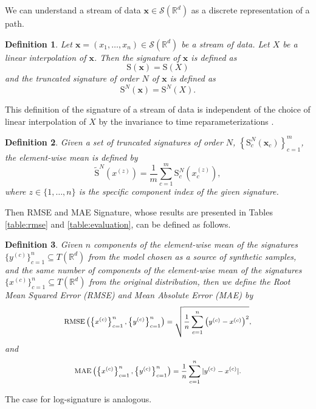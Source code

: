 \documentclass[lettersize,journal]{IEEEtran}
\newtheorem{definition}{Definition}
\begin{document}
We can understand a stream of data $\mathbf{x}\in \mathcal{S}(\mathbb{R}^{d})$ as a discrete representation of a path. 

\begin{definition}\label{def:s}
	Let $\mathbf x=(x_1, \ldots, x_n)\in \mathcal S(\mathbb R^d)$ be a stream of data. Let $X$ be a linear interpolation of $\mathbf x$. Then the signature of $\mathbf x$ is defined as
	\begin{equation}
	\mathrm{S}(\mathbf x) = \mathrm{S}(X)
	\end{equation}
	and the truncated signature of order $N$ of $\mathbf x$ is defined as
	\begin{equation}
	\mathrm{S}^N(\mathbf x) = \mathrm{S}^N(X).
	\end{equation}
\end{definition}

This definition of the signature of a stream of data is independent of the choice of linear interpolation of $X$ by the invariance to time reparameterizations \cite{Bonnier2019}.
\\

\begin{definition}
    Given a set of truncated signatures of order $N$, $\left\{ \mathrm{S}^{N}_{c}(\mathbf{x}_{c})\right\}_{c=1}^{m}$, the element-wise mean is defined by
    \begin{equation}
    \tilde{\mathrm{S}}^{N}(x^{(z)})=\frac{1}{m} \sum_{c=1}^{m}\mathrm{S}^{N}_{c}(x^{(z)}_{c}),    
	\end{equation}
	where $z \in \{1,\ldots,n\}$ is the specific component index of the given signature.
\end{definition}

Then RMSE and MAE Signature, whose results are presented in Tables \ref{table:rmse} and \ref{table:evaluation}, can be defined as follows.

\begin{definition}
    Given $n$ components of the element-wise mean of the signatures $\{y^{(c)}\}^{n}_{c=1}\subseteq T(\mathbb{R}^{d})$ from the model chosen as a source of synthetic samples, and the same number of components of the element-wise mean of the signatures $\{x^{(c)}\}^{n}_{c=1}\subseteq T(\mathbb{R}^{d})$ from the original distribution, then we define the Root Mean Squared Error (RMSE) and Mean Absolute Error (MAE) by
    \begin{equation}
    \medmath{\textnormal{RMSE}\left(\left\{x^{(c)}\right\}^{n}_{c=1},\left\{y^{(c)}\right\}^{n}_{c=1}\right) = \sqrt{\frac{1}{n} \sum_{c=1}^{n} \left( y^{(c)} - x^{(c)}\right)^{2}},}
	\end{equation}
	and
    \begin{equation}
    \medmath{\textnormal{MAE}\left(\left\{x^{(c)}\right\}^{n}_{c=1},\left\{y^{(c)}\right\}^{n}_{c=1}\right) = \frac{1}{n} \sum_{c=1}^{n} | y^{(c)} - x^{(c)} |.}
	\end{equation}
\end{definition}
The case for log-signature is analogous.
\end{document}
